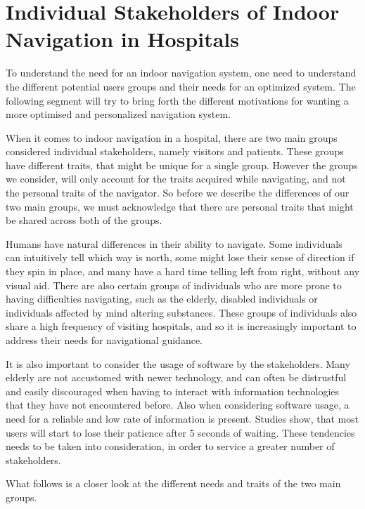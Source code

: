 \section{Individual Stakeholders of Indoor Navigation in Hospitals} %
\label{sec:interusers}

To understand the need for an indoor navigation system, one need to understand the different potential users groups and their needs for an optimized system. The following segment will try to bring forth the different motivations for wanting a more optimised and personalized navigation system.

When it comes to indoor navigation in a hospital, there are two main groups considered individual stakeholders, namely visitors and patients. These groups have different traits, that might be unique for a single group. However the groups we consider, will only account for the traits acquired while navigating, and not the personal traits of the navigator. So before we describe the differences of our two main groups, we must acknowledge that there are personal traits that might be shared across both of the groups.

Humans have natural differences in their ability to navigate. Some individuals can intuitively tell which way is north, some might lose their sense of direction if they spin in place, and many have a hard time telling left from right, without any visual aid\cite{naturtalenter}. There are also certain groups of individuals who are more prone to having difficulties navigating, such as the elderly, disabled individuals or individuals affected by mind altering substances\cite{MCI}. These groups of individuals also share a high frequency of visiting hospitals, and so it is increasingly important to address their needs for navigational guidance\cite{generel}.

It is also important to consider the usage of software by the stakeholders. Many elderly are not accustomed with newer technology, and can often be distrustful and easily discouraged when having to interact with information technologies that they have not encountered before\cite{gamle_teknologi}. Also when considering software usage, a need for a reliable and low rate of information is present. Studies show, that most users will start to lose their patience after 5 seconds of waiting\cite{ventetid}. These tendencies needs to be taken into consideration, in order to service a greater number of stakeholders.

What follows is a closer look at the different needs and traits of the two main groups.

